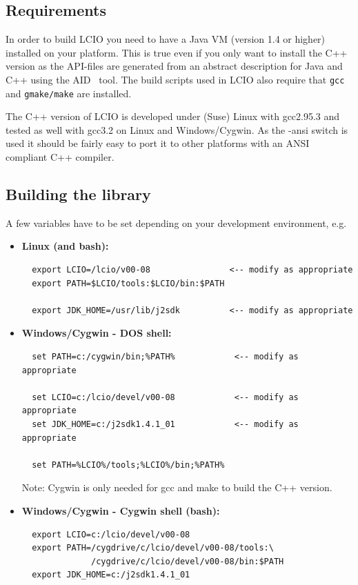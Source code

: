 \documentclass[twoside]{article}
\begin{document}
\subsection{Requirements}
In order to build LCIO you need to have a Java VM (version 1.4 or higher) installed 
on your platform. This is true even if you only want to install the C++ version as the 
API-files are generated from an abstract description for Java and C++ using the 
AID~\cite{ref_aid} tool. The build scripts used in LCIO also require that \verb$gcc$ and 
\verb$gmake/make$ are installed.

The C++ version of LCIO is developed under (Suse) Linux with gcc2.95.3 and tested
as well with gcc3.2 on Linux and Windows/Cygwin. 
As the -ansi switch is used it should be fairly easy to port it to other platforms with
an ANSI compliant C++ compiler.

\subsection {Building the library}

A few variables have to be set depending on your development environment, e.g.
\begin{itemize}
\item{ {\bf Linux (and bash):} 
\begin{verbatim} 
  export LCIO=/lcio/v00-08                <-- modify as appropriate
  export PATH=$LCIO/tools:$LCIO/bin:$PATH

  export JDK_HOME=/usr/lib/j2sdk          <-- modify as appropriate
\end{verbatim} 
}
\item{ {\bf Windows/Cygwin - DOS shell:} 
\begin{verbatim}
  set PATH=c:/cygwin/bin;%PATH%            <-- modify as appropriate

  set LCIO=c:/lcio/devel/v00-08            <-- modify as appropriate
  set JDK_HOME=c:/j2sdk1.4.1_01            <-- modify as appropriate 

  set PATH=%LCIO%/tools;%LCIO%/bin;%PATH%
\end{verbatim}
Note: Cygwin is only needed for gcc and make to build the C++ version.
}
\item{ {\bf Windows/Cygwin - Cygwin shell (bash):} 
\begin{verbatim}
  export LCIO=c:/lcio/devel/v00-08
  export PATH=/cygdrive/c/lcio/devel/v00-08/tools:\
              /cygdrive/c/lcio/devel/v00-08/bin:$PATH
  export JDK_HOME=c:/j2sdk1.4.1_01
\end{verbatim} %
}
\end{itemize}
\end{document}
